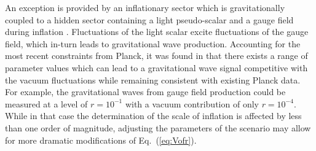 
An exception is provided by an inflationary sector which is gravitationally coupled to a hidden sector containing a light pseudo-scalar and a gauge field during inflation \cite{Barnaby:2012xt,Peloso:2016gqs}. Fluctuations of the light scalar excite fluctuations of the gauge field, which in-turn leads to gravitational wave production. Accounting for the most recent constraints from Planck, it was found in \cite{Namba:2015gja,Peloso:2016gqs} that there exists a range of parameter values which can lead to a gravitational wave signal competitive with the vacuum fluctuations while remaining consistent with existing Planck data. For example, the gravitational waves from gauge field production could be measured at a level of $r=10^{-1}$ with a vacuum contribution of only $r=10^{-4}$. While in that case the determination of the scale of inflation is affected by less than one order of magnitude, adjusting the parameters of the scenario may allow for more dramatic modifications of Eq.~(\ref{eq:Vofr}).

